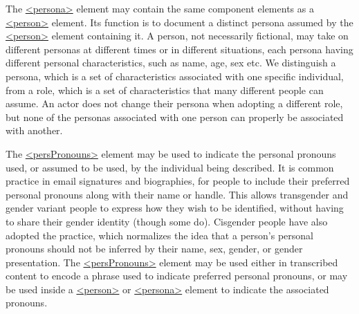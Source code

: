 The \hyperref[TEI.persona]{<persona>} element may contain the same component elements as a \hyperref[TEI.person]{<person>} element. Its function is to document a distinct persona assumed by the \hyperref[TEI.person]{<person>} element containing it. A person, not necessarily fictional, may take on different personas at different times or in different situations, each persona having different personal characteristics, such as name, age, sex etc. We distinguish a persona, which is a set of characteristics associated with one specific individual, from a role, which is a set of characteristics that many different people can assume. An actor does not change their persona when adopting a different role, but none of the personas associated with one person can properly be associated with another.\par
The \hyperref[TEI.persPronouns]{<persPronouns>} element may be used to indicate the personal pronouns used, or assumed to be used, by the individual being described. It is common practice in email signatures and biographies, for people to include their preferred personal pronouns along with their name or handle. This allows transgender and gender variant people to express how they wish to be identified, without having to share their gender identity (though some do). Cisgender people have also adopted the practice, which normalizes the idea that a person's personal pronouns should not be inferred by their name, sex, gender, or gender presentation. The \hyperref[TEI.persPronouns]{<persPronouns>} element may be used either in transcribed content to encode a phrase used to indicate preferred personal pronouns, or may be used inside a \hyperref[TEI.person]{<person>} or \hyperref[TEI.persona]{<persona>} element to indicate the associated pronouns.\par
